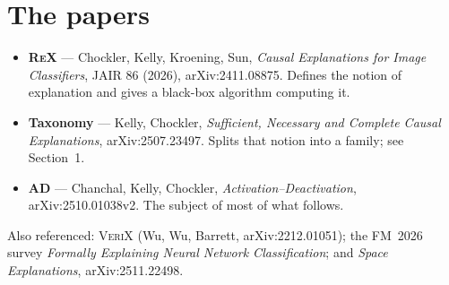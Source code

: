 \documentclass[11pt,a4paper]{article}
\newcommand{\rex}{\textsc{ReX}}
\newcommand{\verix}{\textsc{VeriX}}
\newcommand{\ad}{\textsc{AD}}
\begin{document}
\section*{The papers}

\begin{itemize}[leftmargin=1.2em]
\item \textbf{\rex{}} --- Chockler, Kelly, Kroening, Sun, \emph{Causal Explanations
for Image Classifiers}, JAIR 86 (2026), arXiv:2411.08875. Defines the notion of
explanation and gives a black-box algorithm computing it.
\item \textbf{Taxonomy} --- Kelly, Chockler, \emph{Sufficient, Necessary and
Complete Causal Explanations}, arXiv:2507.23497. Splits that notion into a
family; see Section~1.
\item \textbf{\ad{}} --- Chanchal, Kelly, Chockler, \emph{Activation--Deactivation},
arXiv:2510.01038v2. The subject of most of what follows.
\end{itemize}

\noindent
Also referenced: \verix{} (Wu, Wu, Barrett, arXiv:2212.01051); the FM~2026 survey
\emph{Formally Explaining Neural Network Classification}; and \emph{Space
Explanations}, arXiv:2511.22498.
\end{document}
